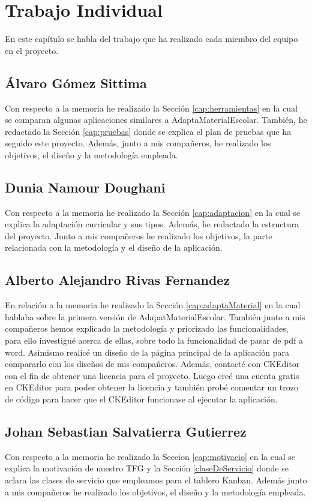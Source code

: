 \chapter{Trabajo Individual}
\label{cap:TrabajoIndividual}

En este capítulo se habla del trabajo que ha realizado cada miembro del equipo en el proyecto.

\section{Álvaro Gómez Sittima}
Con respecto a la memoria he realizado la Sección \ref{cap:herramientas} en la cual se comparan algunas aplicaciones similares a AdaptaMaterialEscolar. También, he redactado la Sección \ref{cap:pruebas} donde se explica el plan de pruebas que ha seguido este proyecto. Además, junto a mis compañeros, he realizado los objetivos, el diseño y la metodología empleada.

\section{Dunia Namour Doughani}
Con respecto a la memoria he realizado la Sección \ref{cap:adaptacion} en la cual se explica la adaptación curricular y sus tipos. Además, he redactado la estructura del proyecto. Junto a mis compañeros he realizado los objetivos, la parte relacionada con la metodología y el diseño de la aplicación.

\section{Alberto Alejandro Rivas Fernandez}
En relación a la memoria he realizado la Sección \ref{cap:adaptaMaterial} en la cual hablaba sobre la primera versión de AdapatMaterialEscolar. También junto a mis compañeros hemos explicado la metodología y priorizado las funcionalidades, para ello investigué acerca de ellas, sobre todo la funcionalidad de pasar de pdf a word. Asimismo realicé un diseño de la página principal de la aplicación para compararlo con los diseños de mis compañeros. Además, contacté con CKEditor con el fin de obtener una licencia para el proyecto. Luego creé una cuenta gratis en CKEditor para poder obtener la licencia y también probé comentar un trozo de código para hacer que el CKEditor funcionase al ejecutar la aplicación.

\section{Johan Sebastian Salvatierra Gutierrez}
Con respecto a la memoria he realizado la Seccion \ref{cap:motivacio} en la cual se explica la motivación de nuestro TFG y la Sección \ref{claseDeServicio} donde se aclara las clases de servicio que empleamos para el tablero Kanban.
Además junto a mis compañeros he realizado los objetivos, el diseño y la metodología empleada.